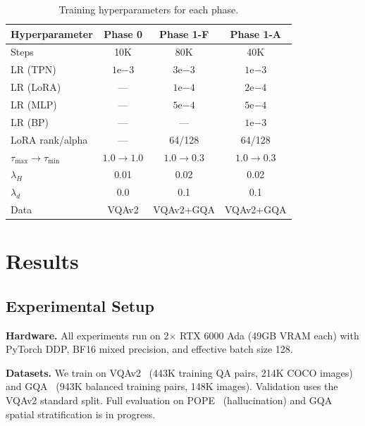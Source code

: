 \documentclass{article}
\begin{document}
\begin{table}[t]
\caption{Training hyperparameters for each phase.}
\label{tab:hparam}
\vskip 0.1in
\centering
\begin{small}
\begin{tabular}{lccc}
\toprule
\textbf{Hyperparameter} & \textbf{Phase 0} & \textbf{Phase 1-F} & \textbf{Phase 1-A} \\
\midrule
Steps & 10K & 80K & 40K \\
LR (TPN) & $1\mathrm{e}{-3}$ & $3\mathrm{e}{-3}$ & $1\mathrm{e}{-3}$ \\
LR (LoRA) & — & $1\mathrm{e}{-4}$ & $2\mathrm{e}{-4}$ \\
LR (MLP) & — & $5\mathrm{e}{-4}$ & $5\mathrm{e}{-4}$ \\
LR (BP) & — & — & $1\mathrm{e}{-3}$ \\
LoRA rank/alpha & — & 64/128 & 64/128 \\
$\tau_{\max} \to \tau_{\min}$ & $1.0 \to 1.0$ & $1.0 \to 0.3$ & $1.0 \to 0.3$ \\
$\lambda_H$ & 0.01 & 0.02 & 0.02 \\
$\lambda_d$ & 0.0 & 0.1 & 0.1 \\
Data & VQAv2 & VQAv2+GQA & VQAv2+GQA \\
\bottomrule
\end{tabular}
\end{small}
\end{table}

\section{Results}
\label{sec:results}

\subsection{Experimental Setup}

\textbf{Hardware.}
All experiments run on 2$\times$ RTX 6000 Ada (49GB VRAM each) with PyTorch DDP,
BF16 mixed precision, and effective batch size 128.

\textbf{Datasets.}
We train on VQAv2~\cite{goyal2017vqav2} (443K training QA pairs, 214K COCO images)
and GQA~\cite{hudson2019gqa} (943K balanced training pairs, 148K images).
Validation uses the VQAv2 standard split.
Full evaluation on POPE~\cite{li2023pope} (hallucination) and GQA spatial stratification
is in progress.
\end{document}
